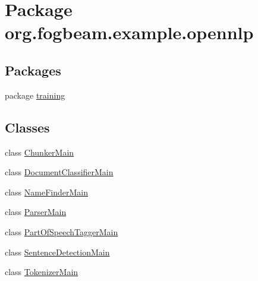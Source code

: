 \hypertarget{namespaceorg_1_1fogbeam_1_1example_1_1opennlp}{}\section{Package org.\+fogbeam.\+example.\+opennlp}
\label{namespaceorg_1_1fogbeam_1_1example_1_1opennlp}
\subsection*{Packages}
\begin{DoxyCompactItemize}
\item 
package \hyperlink{namespaceorg_1_1fogbeam_1_1example_1_1opennlp_1_1training}{training}
\end{DoxyCompactItemize}
\subsection*{Classes}
\begin{DoxyCompactItemize}
\item 
class \hyperlink{classorg_1_1fogbeam_1_1example_1_1opennlp_1_1_chunker_main}{Chunker\+Main}
\item 
class \hyperlink{classorg_1_1fogbeam_1_1example_1_1opennlp_1_1_document_classifier_main}{Document\+Classifier\+Main}
\item 
class \hyperlink{classorg_1_1fogbeam_1_1example_1_1opennlp_1_1_name_finder_main}{Name\+Finder\+Main}
\item 
class \hyperlink{classorg_1_1fogbeam_1_1example_1_1opennlp_1_1_parser_main}{Parser\+Main}
\item 
class \hyperlink{classorg_1_1fogbeam_1_1example_1_1opennlp_1_1_part_of_speech_tagger_main}{Part\+Of\+Speech\+Tagger\+Main}
\item 
class \hyperlink{classorg_1_1fogbeam_1_1example_1_1opennlp_1_1_sentence_detection_main}{Sentence\+Detection\+Main}
\item 
class \hyperlink{classorg_1_1fogbeam_1_1example_1_1opennlp_1_1_tokenizer_main}{Tokenizer\+Main}
\end{DoxyCompactItemize}
